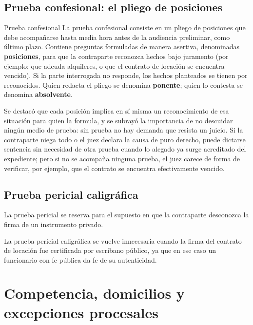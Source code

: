 \documentclass[12pt,oneside]{book}
\begin{document}
\section{Prueba confesional: el pliego de posiciones}

\begin{definition}{Prueba confesional}
La prueba confesional consiste en un pliego de posiciones que debe acompañarse hasta media hora antes de la audiencia preliminar, como último plazo. Contiene preguntas formuladas de manera asertiva, denominadas \textbf{posiciones}, para que la contraparte reconozca hechos bajo juramento (por ejemplo: que adeuda alquileres, o que el contrato de locación se encuentra vencido). Si la parte interrogada no responde, los hechos planteados se tienen por reconocidos. Quien redacta el pliego se denomina \textbf{ponente}; quien lo contesta se denomina \textbf{absolvente}.
\end{definition}

Se destacó que cada posición implica en sí misma un reconocimiento de esa situación para quien la formula, y se subrayó la importancia de no descuidar ningún medio de prueba: sin prueba no hay demanda que resista un juicio. Si la contraparte niega todo o el juez declara la causa de puro derecho, puede dictarse sentencia sin necesidad de otra prueba cuando lo alegado ya surge acreditado del expediente; pero si no se acompaña ninguna prueba, el juez carece de forma de verificar, por ejemplo, que el contrato se encuentra efectivamente vencido.

\section{Prueba pericial caligráfica}

La prueba pericial se reserva para el supuesto en que la contraparte desconozca la firma de un instrumento privado.

\begin{important}
La prueba pericial caligráfica se vuelve innecesaria cuando la firma del contrato de locación fue certificada por escribano público, ya que en ese caso un funcionario con fe pública da fe de su autenticidad.
\end{important}

\chapter{Competencia, domicilios y excepciones procesales}
\end{document}
